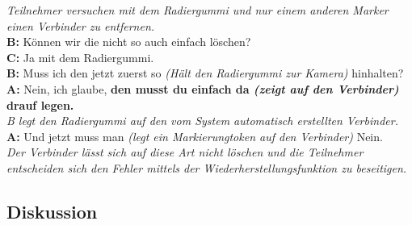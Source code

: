 \begin{transkript}
	\emph{Teilnehmer versuchen mit dem Radiergummi und nur einem anderen Marker einen Verbinder zu entfernen.}\\
	\textbf{B:} Können wir die nicht so auch einfach löschen?\\
	\textbf{C:} Ja mit dem Radiergummi.\\
	\textbf{B:} Muss ich den jetzt zuerst so \emph{(Hält den Radiergummi zur Kamera)} hinhalten?\\
	\textbf{A:} Nein, ich glaube, \textbf{den musst du einfach da \emph{(zeigt auf den Verbinder)} drauf legen.}\\
	\emph{B legt den Radiergummi auf den vom System automatisch erstellten Verbinder.}\\
	\textbf{A:} Und jetzt muss man \emph{(legt ein Markierungtoken auf den Verbinder)} Nein.\\
	\emph{Der Verbinder lässt sich auf diese Art nicht löschen und die Teilnehmer entscheiden sich den Fehler mittels der Wiederherstellungsfunktion zu beseitigen.}
\end{transkript}

\subsection{Diskussion} %


